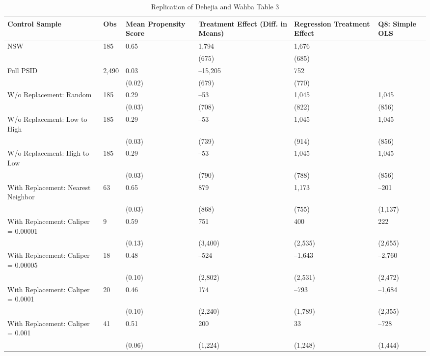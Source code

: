 \begin{table}[tbp] \centering
{}

\caption{Replication of Dehejia and Wahba Table 3}
\begin{tabularx}{\linewidth}{@{}lCCCCC@{}}

\toprule
{Control Sample}&{Obs}&{Mean Propensity Score}&{Treatment Effect (Diff. in Means)}&{Regression Treatment Effect}&{Q8: Simple OLS} \tabularnewline
\midrule \addlinespace[\belowrulesep]
NSW&185&0.65&1,794&1,676& \tabularnewline
&&&(675)&(685)& \tabularnewline
Full PSID&2,490&0.03&--15,205&752& \tabularnewline
&&(0.02)&(679)&(770)& \tabularnewline
W/o Replacement: Random&185&0.29&--53&1,045&1,045 \tabularnewline
&&(0.03)&(708)&(822)&(856) \tabularnewline
W/o Replacement: Low to High&185&0.29&--53&1,045&1,045 \tabularnewline
&&(0.03)&(739)&(914)&(856) \tabularnewline
W/o Replacement: High to Low&185&0.29&--53&1,045&1,045 \tabularnewline
&&(0.03)&(790)&(788)&(856) \tabularnewline
With Replacement: Nearest Neighbor&63&0.65&879&1,173&--201 \tabularnewline
&&(0.03)&(868)&(755)&(1,137) \tabularnewline
With Replacement: Caliper = 0.00001&9&0.59&751&400&222 \tabularnewline
&&(0.13)&(3,400)&(2,535)&(2,655) \tabularnewline
With Replacement: Caliper = 0.00005&18&0.48&--524&--1,643&--2,760 \tabularnewline
&&(0.10)&(2,802)&(2,531)&(2,472) \tabularnewline
With Replacement: Caliper = 0.0001&20&0.46&174&--793&--1,684 \tabularnewline
&&(0.10)&(2,240)&(1,789)&(2,355) \tabularnewline
With Replacement: Caliper = 0.001&41&0.51&200&33&--728 \tabularnewline
&&(0.06)&(1,224)&(1,248)&(1,444) \tabularnewline
\bottomrule 

\end{tabularx}
\end{table}
